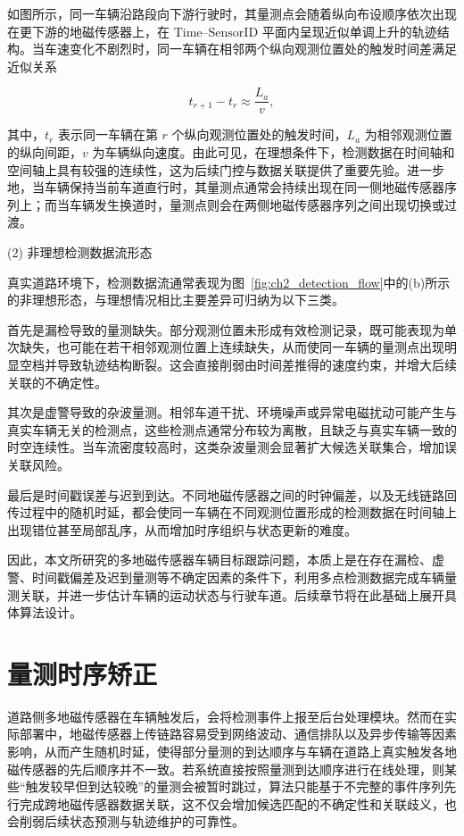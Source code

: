 \documentclass{xdupgthesis}
\begin{document}
如图所示，同一车辆沿路段向下游行驶时，其量测点会随着纵向布设顺序依次出现在更下游的地磁传感器上，在 $\text{Time--SensorID}$ 平面内呈现近似单调上升的轨迹结构。当车速变化不剧烈时，同一车辆在相邻两个纵向观测位置处的触发时间差满足近似关系

\begin{equation}
	t_{r+1}-t_r \approx \frac{L_a}{v},
	\label{eq:ch2_time_interval}
\end{equation}

其中，$t_r$ 表示同一车辆在第 $r$ 个纵向观测位置处的触发时间，$L_a$ 为相邻观测位置的纵向间距，$v$ 为车辆纵向速度。由此可见，在理想条件下，检测数据在时间轴和空间轴上具有较强的连续性，这为后续门控与数据关联提供了重要先验。进一步地，当车辆保持当前车道直行时，其量测点通常会持续出现在同一侧地磁传感器序列上；而当车辆发生换道时，量测点则会在两侧地磁传感器序列之间出现切换或过渡。


\textnormal{(2) 非理想检测数据流形态}\par\vspace{0.3\baselineskip}

真实道路环境下，检测数据流通常表现为图~\ref{fig:ch2_detection_flow}中的(b)所示的非理想形态，与理想情况相比主要差异可归纳为以下三类。

首先是漏检导致的量测缺失。部分观测位置未形成有效检测记录，既可能表现为单次缺失，也可能在若干相邻观测位置上连续缺失，从而使同一车辆的量测点出现明显空档并导致轨迹结构断裂。这会直接削弱由时间差推得的速度约束，并增大后续关联的不确定性。

其次是虚警导致的杂波量测。相邻车道干扰、环境噪声或异常电磁扰动可能产生与真实车辆无关的检测点，这些检测点通常分布较为离散，且缺乏与真实车辆一致的时空连续性。当车流密度较高时，这类杂波量测会显著扩大候选关联集合，增加误关联风险。

最后是时间戳误差与迟到到达。不同地磁传感器之间的时钟偏差，以及无线链路回传过程中的随机时延，都会使同一车辆在不同观测位置形成的检测数据在时间轴上出现错位甚至局部乱序，从而增加时序组织与状态更新的难度。

因此，本文所研究的多地磁传感器车辆目标跟踪问题，本质上是在存在漏检、虚警、时间戳偏差及迟到量测等不确定因素的条件下，利用多点检测数据完成车辆量测关联，并进一步估计车辆的运动状态与行驶车道。后续章节将在此基础上展开具体算法设计。




\section{量测时序矫正}

道路侧多地磁传感器在车辆触发后，会将检测事件上报至后台处理模块。然而在实际部署中，地磁传感器上传链路容易受到网络波动、通信排队以及异步传输等因素影响，从而产生随机时延，使得部分量测的到达顺序与车辆在道路上真实触发各地磁传感器的先后顺序并不一致。若系统直接按照量测到达顺序进行在线处理，则某些“触发较早但到达较晚”的量测会被暂时跳过，算法只能基于不完整的事件序列先行完成跨地磁传感器数据关联，这不仅会增加候选匹配的不确定性和关联歧义，也会削弱后续状态预测与轨迹维护的可靠性。
\end{document}
